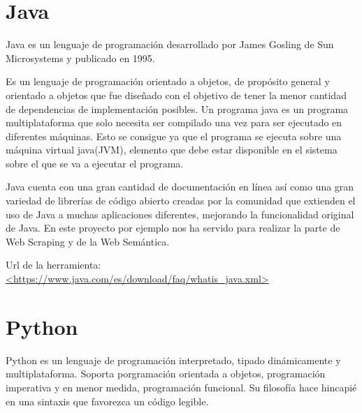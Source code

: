 

\section{Java}

Java es un lenguaje de programación desarrollado por James Gosling de Sun Microsystems y publicado en 1995.

Es un lenguaje de programación orientado a objetos, de propósito general y orientado a objetos que fue diseñado con el objetivo de tener la menor cantidad de dependencias de implementación posibles. Un programa java es un programa multiplataforma que solo necesita ser compilado una vez para ser ejecutado en diferentes máquinas. Esto se consigue ya que el programa se ejecuta sobre una máquina virtual java(JVM), elemento que debe estar disponible en el sistema sobre el que se va a ejecutar el programa.

Java cuenta con una gran cantidad de documentación en línea así como una gran variedad de librerías de código abierto creadas por la comunidad que extienden el uso de Java a muchas aplicaciones diferentes, mejorando la funcionalidad original de Java. En este proyecto por ejemplo nos ha servido para realizar la parte de Web Scraping y de la Web Semántica.

Url de la herramienta: \url{<https://www.java.com/es/download/faq/whatis_java.xml>}

\section{Python}

Python es un lenguaje de programación  interpretado, tipado dinámicamente y multiplataforma. Soporta porgramación orientada a objetos, programación imperativa y en menor medida, programación funcional. Su filosofía hace hincapié en una sintaxis que favorezca un código legible.\cite{wiki:python}

